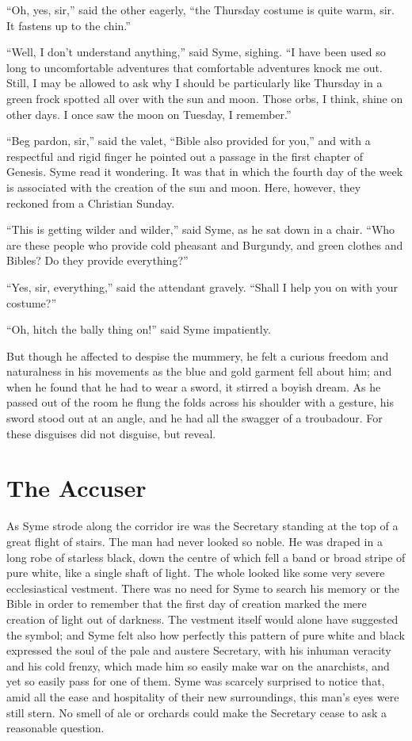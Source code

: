 \documentclass{book}
\begin{document}
“Oh, yes, sir,” said the other eagerly, “the Thursday costume is quite warm, sir. It fastens up to the chin.”

“Well, I don’t understand anything,” said Syme, sighing. “I have been used so long to uncomfortable adventures that comfortable adventures knock me out. Still, I may be allowed to ask why I should be particularly like Thursday in a green frock spotted all over with the sun and moon. Those orbs, I think, shine on other days. I once saw the moon on Tuesday, I remember.”

“Beg pardon, sir,” said the valet, “Bible also provided for you,” and with a respectful and rigid finger he pointed out a passage in the first chapter of Genesis. Syme read it wondering. It was that in which the fourth day of the week is associated with the creation of the sun and moon. Here, however, they reckoned from a Christian Sunday.

“This is getting wilder and wilder,” said Syme, as he sat down in a chair. “Who are these people who provide cold pheasant and Burgundy, and green clothes and Bibles? Do they provide everything?”

“Yes, sir, everything,” said the attendant gravely. “Shall I help you on with your costume?”

“Oh, hitch the bally thing on!” said Syme impatiently.

But though he affected to despise the mummery, he felt a curious freedom and naturalness in his movements as the blue and gold garment fell about him; and when he found that he had to wear a sword, it stirred a boyish dream. As he passed out of the room he flung the folds across his shoulder with a gesture, his sword stood out at an angle, and he had all the swagger of a troubadour. For these disguises did not disguise, but reveal.

\chapter{The Accuser}
\label{chapter-14}
As Syme strode along the corridor ire was the Secretary standing at the top of a great flight of stairs. The man had never looked so noble. He was draped in a long robe of starless black, down the centre of which fell a band or broad stripe of pure white, like a single shaft of light. The whole looked like some very severe ecclesiastical vestment. There was no need for Syme to search his memory or the Bible in order to remember that the first day of creation marked the mere creation of light out of darkness. The vestment itself would alone have suggested the symbol; and Syme felt also how perfectly this pattern of pure white and black expressed the soul of the pale and austere Secretary, with his inhuman veracity and his cold frenzy, which made him so easily make war on the anarchists, and yet so easily pass for one of them. Syme was scarcely surprised to notice that, amid all the ease and hospitality of their new surroundings, this man’s eyes were still stern. No smell of ale or orchards could make the Secretary cease to ask a reasonable question.
\end{document}
